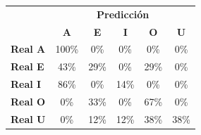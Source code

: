 \begin{tabular}{lccccc}
\toprule
 & \multicolumn{5}{c}{\textbf{Predicción}} \\
 & \textbf{A} & \textbf{E} & \textbf{I} & \textbf{O} & \textbf{U} \\
\midrule
\textbf{Real A} & \cellcolor[rgb]{0.30,0.30,1.00} \color{white} 100\% & \cellcolor[rgb]{1.00,1.00,1.00}  0\% & \cellcolor[rgb]{1.00,1.00,1.00}  0\% & \cellcolor[rgb]{1.00,1.00,1.00}  0\% & \cellcolor[rgb]{1.00,1.00,1.00}  0\% \\
\textbf{Real E} & \cellcolor[rgb]{0.70,0.70,1.00}  43\% & \cellcolor[rgb]{0.80,0.80,1.00}  29\% & \cellcolor[rgb]{1.00,1.00,1.00}  0\% & \cellcolor[rgb]{0.80,0.80,1.00}  29\% & \cellcolor[rgb]{1.00,1.00,1.00}  0\% \\
\textbf{Real I} & \cellcolor[rgb]{0.40,0.40,1.00} \color{white} 86\% & \cellcolor[rgb]{1.00,1.00,1.00}  0\% & \cellcolor[rgb]{0.90,0.90,1.00}  14\% & \cellcolor[rgb]{1.00,1.00,1.00}  0\% & \cellcolor[rgb]{1.00,1.00,1.00}  0\% \\
\textbf{Real O} & \cellcolor[rgb]{1.00,1.00,1.00}  0\% & \cellcolor[rgb]{0.77,0.77,1.00}  33\% & \cellcolor[rgb]{1.00,1.00,1.00}  0\% & \cellcolor[rgb]{0.53,0.53,1.00} \color{white} 67\% & \cellcolor[rgb]{1.00,1.00,1.00}  0\% \\
\textbf{Real U} & \cellcolor[rgb]{1.00,1.00,1.00}  0\% & \cellcolor[rgb]{0.91,0.91,1.00}  12\% & \cellcolor[rgb]{0.91,0.91,1.00}  12\% & \cellcolor[rgb]{0.74,0.74,1.00}  38\% & \cellcolor[rgb]{0.74,0.74,1.00}  38\% \\
\bottomrule
\end{tabular}